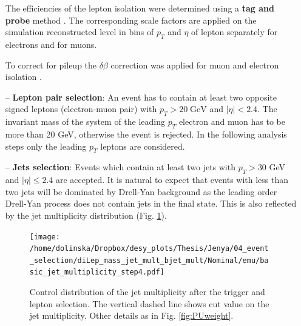 \begin{itemize}
 The efficiencies of the lepton isolation were determined using a \textbf{tag and probe} method \cite{TWikiTP}. The corresponding scale factors are applied on the
 simulation reconstructed level in bins of $p_{T}$ and $\eta$ of lepton separately for electrons and for muons.
 
 To correct for pileup the $\delta\beta$ correction was applied for muon and electron isolation \cite{TWikidbeta, Chatrchyan:2012xi}.
 \item [--] \textbf{Lepton pair selection}: An event has to contain at least two opposite signed leptons (electron-muon pair) with $p_{T} > 20 \; \textrm{GeV}$ and $|\eta| < 2.4$.
 The invariant mass of the system of the leading $p_{T}$ electron and muon has to be more than 20 GeV, otherwise the event is rejected. In the following analysis steps
 only the leading $p_{T}$ leptons are considered.
 \item [--] \textbf{Jets selection}: Events which contain at least two jets with $p_{T} > 30$ GeV and $|\eta| \leq 2.4$ are accepted. It is natural to expect
 that events with less than two jets will be dominated by Drell-Yan background as the leading order Drell-Yan process does not contain jets in the final state. This is also 
 reflected by the jet multiplicity distribution (Fig. \ref{fig:jetMultiSel}). 
 
 \begin{figure}[h]
  \centering
  \texttt{[image: /home/dolinska/Dropbox/desy\_plots/Thesis/Jenya/04\_event\_selection/diLep\_mass\_jet\_mult\_bjet\_mult/Nominal/emu/basic\_jet\_multiplicity\_step4.pdf]}
  \caption{Control distribution of the jet multiplicity after the trigger and lepton selection. The vertical dashed line shows cut value on the 
  jet multiplicity. Other details as in Fig. \ref{fig:PUweight}.}
  \label{fig:jetMultiSel}
 \end{figure}
 

\end{itemize}
